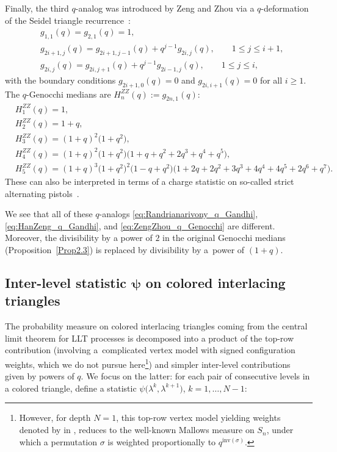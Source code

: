 \documentclass[10pt,a4paper]{amsart}
\numberwithin{equation}{section}
\theoremstyle{definition}
\begin{document}
Finally, the third $q$-analog was introduced by Zeng and Zhou
\cite{ZengZhou2006} via a $q$-deformation of the Seidel triangle recurrence~\cite{Seidel1877}:
\begin{align*}
	&g_{1,1}(q)= g_{2,1}(q)=1,\\
	&g_{2i+1,j}(q)= g_{2i+1,j-1}(q)+q^{j-1}g_{2i,j}(q), \qquad 1\le j\le i+1, \\
	&g_{2i,j}(q)= g_{2i,j+1}(q)+q^{j-1} g_{2i-1,j}(q), \qquad 1\le j\le i,
\end{align*}
with the boundary conditions $g_{2i+1,0}(q)=0$ and $g_{2i,i+1}(q)=0$ for all
$i\ge1$.
The $q$-Genocchi medians are $H_n^{ZZ}(q) := g_{2n,1}(q)$:
\begin{equation}
	\label{eq:ZengZhou_q_Genocchi}
	\begin{split}
		&H_1^{ZZ}(q)= 1, \\ &H_2^{ZZ}(q)= 1 + q, \\ &H_3^{ZZ}(q)= (1 + q)^2 \bigl(1 + q^2\bigr), \\
		&H_4^{ZZ}(q)= (1 + q)^2 \bigl(1 + q^2\bigr) \bigl(1 + q + q^2 + 2q^3 + q^4 + q^5\bigr), \\
		&H_5^{ZZ}(q)= (1 + q)^3 \bigl(1 + q^2\bigr)^2 \bigl(1 - q + q^2\bigr) \bigl(1 + 2q + 2q^2 + 3q^3
		+ 4q^4 + 4q^5 + 2q^6 + q^7\bigr).
	\end{split}
\end{equation}
These can also be interpreted in terms of a charge statistic on so-called strict
alternating pistols~\cite{ZengZhou2006}.

We see that all of these $q$-analogs \eqref{eq:Randrianarivony_q_Gandhi},
\eqref{eq:HanZeng_q_Gandhi}, and
\eqref{eq:ZengZhou_q_Genocchi}
are different.
Moreover, the divisibility by a power of $2$ in the original Genocchi medians
(Proposition~\ref{Prop2.3}) is replaced by divisibility by a~power of
$(1+q)$.

\subsection[Inter-level statistic psi on colored interlacing triangles]{Inter-level statistic $\boldsymbol{\psi}$ on colored interlacing triangles}
\label{subsec:inter_level_statistic}

The probability measure on colored interlacing triangles coming from the central
limit theorem for LLT processes
\cite{ABW2023coloured_LLT}
is decomposed into a product of the top-row contribution (involving a~complicated vertex model with signed configuration weights, which we do not
pursue here\footnote{However, for depth $N=1$, this top-row vertex model yielding weights denoted by  in \cite{ABW2023coloured_LLT},
reduces to the well-known Mallows measure on $S_n$, under which a permutation
$\sigma$ is weighted proportionally to $q^{\mathrm{inv}(\sigma)}$.}) and simpler
inter-level contributions given by powers of $q$.
We focus on the latter: for each pair of consecutive levels in a colored
triangle, define a statistic $\psi\bigl(\lambda^{k}, \lambda^{k+1}\bigr)$, $k=1,\dots,N-1$:
\end{document}
